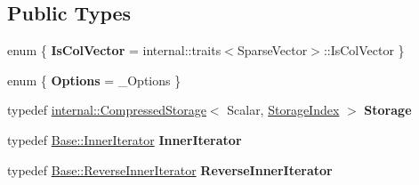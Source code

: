 \subsection*{Public Types}
\begin{DoxyCompactItemize}
\item 
\mbox{\label{class_eigen_1_1_sparse_vector_ae31a58533de0ba94229c312ad950e1f2}} 
enum \{ {\bfseries Is\+Col\+Vector} = internal\+::traits$<$Sparse\+Vector$>$\+::Is\+Col\+Vector
 \}
\item 
\mbox{\label{class_eigen_1_1_sparse_vector_ab5d7f8c726ee7498d5fcb89fc1367fb8}} 
enum \{ {\bfseries Options} = \+\_\+\+Options
 \}
\item 
\mbox{\label{class_eigen_1_1_sparse_vector_a03a6354c77402f4876a74435ded60c28}} 
typedef \mbox{\hyperlink{class_eigen_1_1internal_1_1_compressed_storage}{internal\+::\+Compressed\+Storage}}$<$ Scalar, \mbox{\hyperlink{class_eigen_1_1_sparse_matrix_base_a0b540ba724726ebe953f8c0df06081ed}{Storage\+Index}} $>$ {\bfseries Storage}
\item 
\mbox{\label{class_eigen_1_1_sparse_vector_a8ad41a4a6da46ce8a255481e98033afd}} 
typedef \mbox{\hyperlink{class_eigen_1_1_sparse_compressed_base_1_1_inner_iterator}{Base\+::\+Inner\+Iterator}} {\bfseries Inner\+Iterator}
\item 
\mbox{\label{class_eigen_1_1_sparse_vector_a0638716ee804346a3d6171781874ab12}} 
typedef \mbox{\hyperlink{class_eigen_1_1_sparse_compressed_base_1_1_reverse_inner_iterator}{Base\+::\+Reverse\+Inner\+Iterator}} {\bfseries Reverse\+Inner\+Iterator}
\end{DoxyCompactItemize}
